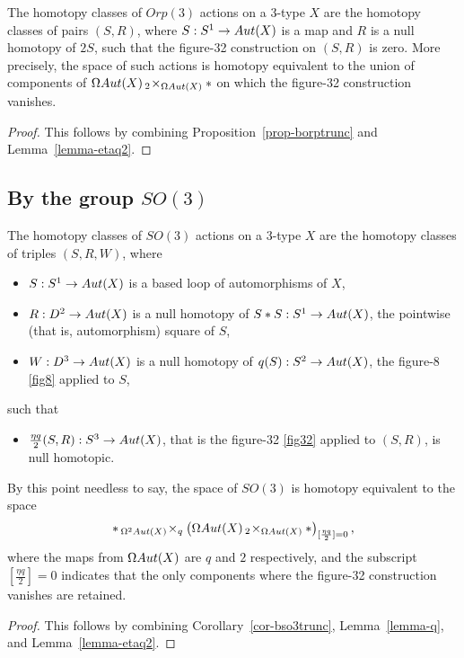 \documentclass{amsart}
\begin{document}
\begin{proposition} 
\label{prop-orpaction}
The homotopy classes of $Orp(3)$ actions on a 3-type $X$ are the homotopy classes of pairs $(S,R)$, where $S: S^1 \rightarrow Aut(X)$ is a map and $R$ is a null homotopy of $2S$, such that the figure-32 construction on $(S,R)$ is zero.  More precisely, the space of such actions is homotopy equivalent to the union of components of $\Omega Aut(X) \,_2\! \times_{\Omega Aut(X)} \ast$ on which the figure-32 construction vanishes.
\end{proposition}
\begin{proof}
This follows by combining Proposition~\ref{prop-borptrunc} and Lemma~\ref{lemma-etaq2}.
\end{proof}



\subsection{By the group $SO(3)$}

\begin{theorem}[Actions of $SO(3)$] 
\label{thm-so3action}
The homotopy classes of $SO(3)$ actions on a 3-type $X$ are the homotopy classes of triples $(S,R,W)$, where 
\begin{itemize}
\item $S: S^1 \rightarrow Aut(X)$ is a based loop of automorphisms of $X$,
\item $R: D^2 \rightarrow Aut(X)$ is a null homotopy of $S \ast S: S^1 \rightarrow Aut(X)$, the pointwise (that is, automorphism) square of $S$,
\item $W: D^3 \rightarrow Aut(X)$ is a null homotopy of $q(S): S^2 \rightarrow Aut(X)$, the figure-8 \cref{fig8} applied to $S$,
\end{itemize}
such that
\begin{itemize}
\item $\frac{\eta q}{2} (S,R) : S^3 \rightarrow Aut(X)$, that is the figure-32 \cref{fig32} applied to $(S,R)$, is null homotopic.
\end{itemize}
\end{theorem}
\nid By this point needless to say, the space of $SO(3)$ is homotopy equivalent to the space
\[
\ast \,_{\Omega^2 Aut(X)}\! \times_q \left(\Omega Aut(X) \,_2\! \times_{\Omega Aut(X)} \ast\right)_{[\frac{\eta q}{2}]=0},
\]
where the maps from $\Omega Aut(X)$ are $q$ and $2$ respectively, and the subscript $[\frac{\eta q}{2}]=0$ indicates that the only components where the figure-32 construction vanishes are retained.
\begin{proof}
This follows by combining Corollary~\ref{cor-bso3trunc}, Lemma~\ref{lemma-q}, and Lemma~\ref{lemma-etaq2}.
\end{proof}
\end{document}
